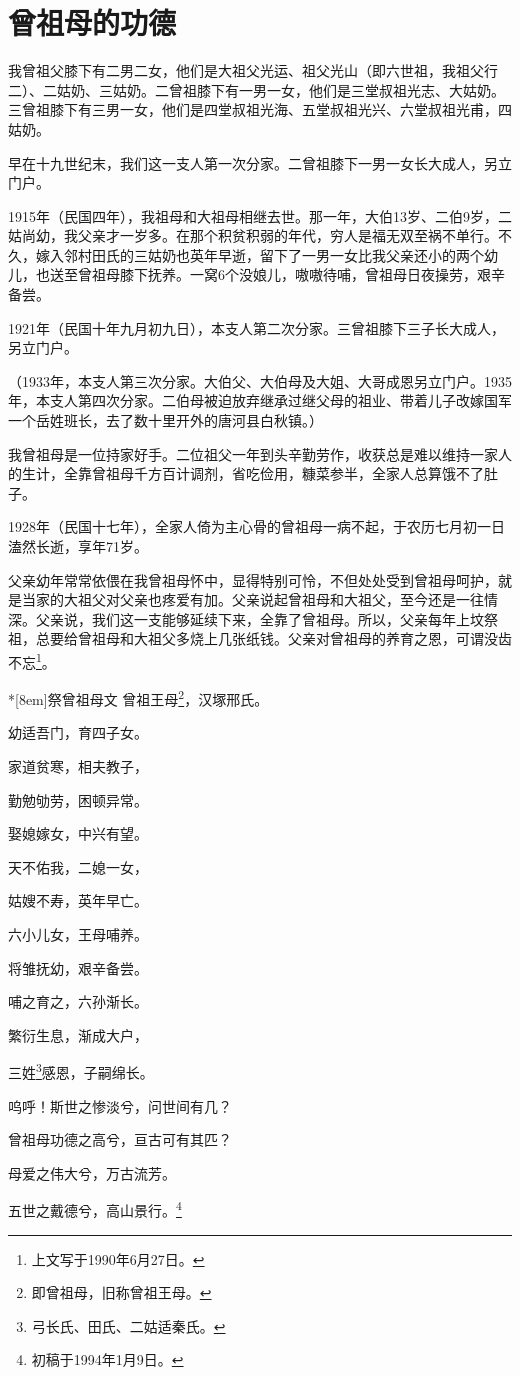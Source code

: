 \documentclass[../../dazhuan.tex]{subfiles}
\begin{document}
	\chapter*{曾祖母的功德}
我曾祖父膝下有二男二女，他们是大祖父光运、祖父光山（即六世祖，我祖父行二）、二姑奶、三姑奶。二曾祖膝下有一男一女，他们是三堂叔祖光志、大姑奶。三曾祖膝下有三男一女，他们是四堂叔祖光海、五堂叔祖光兴、六堂叔祖光甫，四姑奶。

早在十九世纪末，我们这一支人第一次分家。二曾祖膝下一男一女长大成人，另立门户。

1915年（民国四年），我祖母和大祖母相继去世。那一年，大伯13岁、二伯9岁，二姑尚幼，我父亲才一岁多。在那个积贫积弱的年代，穷人是福无双至祸不单行。不久，嫁入邻村田氏的三姑奶也英年早逝，留下了一男一女比我父亲还小的两个幼儿，也送至曾祖母膝下抚养。一窝6个没娘儿，嗷嗷待哺，曾祖母日夜操劳，艰辛备尝。

1921年（民国十年九月初九日），本支人第二次分家。三曾祖膝下三子长大成人，另立门户。

（1933年，本支人第三次分家。大伯父、大伯母及大姐、大哥成恩另立门户。1935年，本支人第四次分家。二伯母被迫放弃继承过继父母的祖业、带着儿子改嫁国军一个岳姓班长，去了数十里开外的唐河县白秋镇。）

我曾祖母是一位持家好手。二位祖父一年到头辛勤劳作，收获总是难以维持一家人的生计，全靠曾祖母千方百计调剂，省吃俭用，糠菜参半，全家人总算饿不了肚子。

1928年（民国十七年），全家人倚为主心骨的曾祖母一病不起，于农历七月初一日溘然长逝，享年71岁。

父亲幼年常常依偎在我曾祖母怀中，显得特别可怜，不但处处受到曾祖母呵护，就是当家的大祖父对父亲也疼爱有加。父亲说起曾祖母和大祖父，至今还是一往情深。父亲说，我们这一支能够延续下来，全靠了曾祖母。所以，父亲每年上坟祭祖，总要给曾祖母和大祖父多烧上几张纸钱。父亲对曾祖母的养育之恩，可谓没齿不忘\footnote{上文写于1990年6月27日。}。

\begin{poem}*[8em]{祭曾祖母文}
曾祖王母\footnote{即曾祖母，旧称曾祖王母。}，汉塚邢氏。

幼适吾门，育四子女。

家道贫寒，相夫教子，

勤勉劬劳，困顿异常。

娶媳嫁女，中兴有望。

天不佑我，二媳一女，

姑嫂不寿，英年早亡。

六小儿女，王母哺养。

将雏抚幼，艰辛备尝。

哺之育之，六孙渐长。

繁衍生息，渐成大户，

三姓\footnote{弓长氏、田氏、二姑适秦氏。}感恩，子嗣绵长。

呜呼！斯世之惨淡兮，问世间有几？

曾祖母功德之高兮，亘古可有其匹？

母爱之伟大兮，万古流芳。

五世之戴德兮，高山景行。\footnote{初稿于1994年1月9日。}
\end{poem}
\end{document}
